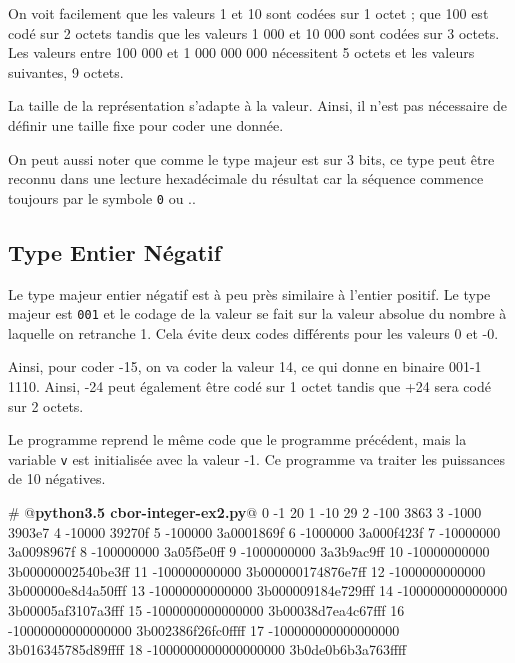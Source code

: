        \vspace{1em}


On voit facilement que les valeurs 1 et 10 sont codées sur 1 octet ; que 100 est codé sur 2 octets tandis que les valeurs 1 000 et 10 000 sont codées sur 3 octets. Les valeurs entre 100 000 et 1 000 000 000 nécessitent 5 octets et les valeurs suivantes, 9 octets.

       \vspace{1em}


La taille de la représentation s'adapte à la valeur. Ainsi, il n'est pas nécessaire de définir une taille fixe pour coder une donnée.

On peut aussi noter que comme le type majeur est sur 3 bits, ce type peut être reconnu dans une lecture hexadécimale du résultat car la séquence commence toujours par le symbole \texttt{0} ou ..

\subsection{Type Entier Négatif}

Le type majeur entier négatif est à peu près similaire à l'entier positif. Le type majeur est \texttt{001} et le codage de la valeur se fait sur la valeur absolue du nombre à laquelle on retranche 1. Cela évite deux codes différents pour les valeurs 0 et -0.

       \vspace{1em}

Ainsi, pour coder -15, on va coder la valeur 14, ce qui donne en binaire 001-1 1110. Ainsi, -24 peut également être codé sur 1 octet tandis que +24 sera codé sur 2 octets.


Le programme  reprend le même code que le programme précédent, mais la variable \texttt{v} est initialisée avec la valeur -1. Ce programme va traiter les puissances de 10 négatives.

\begin{termc}[backgroundcolor=\color{palerod}, language=json, basicstyle=\ttfamily\small, escapechar=@]
  # @\textbf{python3.5 cbor-integer-ex2.py}@
  0                             -1 20
  1                            -10 29
  2                           -100 3863
  3                          -1000 3903e7
  4                         -10000 39270f
  5                        -100000 3a0001869f
  6                       -1000000 3a000f423f
  7                      -10000000 3a0098967f
  8                     -100000000 3a05f5e0ff
  9                    -1000000000 3a3b9ac9ff
 10                   -10000000000 3b00000002540be3ff
 11                  -100000000000 3b000000174876e7ff
 12                 -1000000000000 3b000000e8d4a50fff
 13                -10000000000000 3b000009184e729fff
 14               -100000000000000 3b00005af3107a3fff
 15              -1000000000000000 3b00038d7ea4c67fff
 16             -10000000000000000 3b002386f26fc0ffff
 17            -100000000000000000 3b016345785d89ffff
 18           -1000000000000000000 3b0de0b6b3a763ffff
\end{termc}


